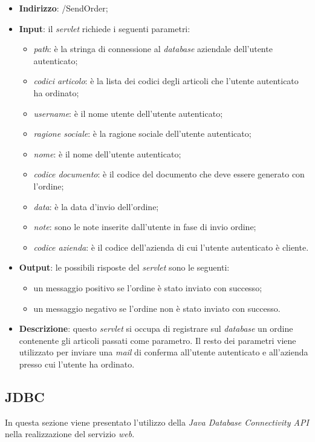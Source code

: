 \begin{itemize}
	\item \textbf{Indirizzo}: /SendOrder;
	\item \textbf{Input}: il \textit{servlet} richiede i seguenti parametri:
		\begin{itemize}
			\item \textit{path}: è la stringa di connessione al \textit{database} aziendale dell'utente autenticato;
			\item \textit{codici articolo}: è la lista dei codici degli articoli che l'utente autenticato ha ordinato;
			\item \textit{username}: è il nome utente dell'utente autenticato;
			\item \textit{ragione sociale}: è la ragione sociale dell'utente autenticato;
			\item \textit{nome}: è il nome dell'utente autenticato;
			\item \textit{codice documento}: è il codice del documento che deve essere generato con l'ordine;
			\item \textit{data}: è la data d'invio dell'ordine;
			\item \textit{note}: sono le note inserite dall'utente in fase di invio ordine;
			\item \textit{codice azienda}: è il codice dell'azienda di cui l'utente autenticato è cliente.
		\end{itemize}
	\item \textbf{Output}: le possibili risposte del \textit{servlet} sono le seguenti:
		\begin{itemize}
			\item un messaggio positivo se l'ordine è stato inviato con successo;
			\item un messaggio negativo se l'ordine non è stato inviato con successo.
		\end{itemize}
	\item \textbf{Descrizione}: questo \textit{servlet} si occupa di registrare sul \textit{database} un ordine contenente gli articoli passati come parametro. Il resto dei parametri viene utilizzato per inviare una \textit{mail} di conferma all'utente autenticato e all'azienda presso cui l'utente ha ordinato.
\end{itemize}
\newpage
\subsection{JDBC}

In questa sezione viene presentato l'utilizzo della \textit{Java Database Connectivity API} nella realizzazione del servizio \textit{web}.

